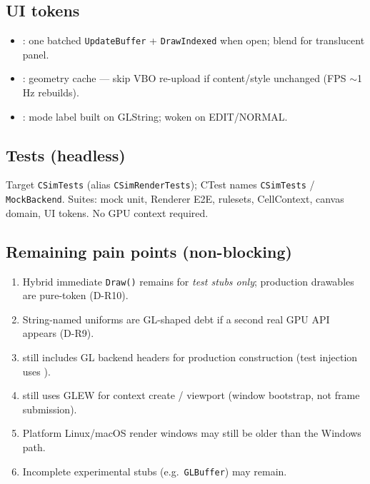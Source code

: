 \subsection{UI tokens}
\begin{itemize}
  \item {}: one batched \texttt{UpdateBuffer} +
        \texttt{DrawIndexed} when open; blend for translucent panel.
  \item {}: geometry cache --- skip VBO re-upload if
        content/style unchanged (FPS $\sim$1\,Hz rebuilds).
  \item {}: mode label built on GLString; woken on EDIT/NORMAL.
\end{itemize}

\subsection{Tests (headless)}
Target \texttt{CSimTests} (alias \texttt{CSimRenderTests}); CTest names
\texttt{CSimTests} / \texttt{MockBackend}. Suites: mock unit, Renderer E2E,
rulesets, CellContext, canvas domain, UI tokens. No GPU context required.

\subsection{Remaining pain points (non-blocking)}
\begin{enumerate}
  \item Hybrid immediate \texttt{Draw()} remains for \emph{test stubs only};
        production drawables are pure-token (D-R10).
  \item String-named uniforms are GL-shaped debt if a second real GPU API appears
        (D-R9).
  \item {} still includes GL backend headers for production
        construction (test injection uses ).
  \item {} still uses GLEW for context create / viewport
        (window bootstrap, not frame submission).
  \item Platform Linux/macOS render windows may still be older than the Windows path.
  \item Incomplete experimental stubs (e.g.\ \texttt{GLBuffer}) may remain.
\end{enumerate}
